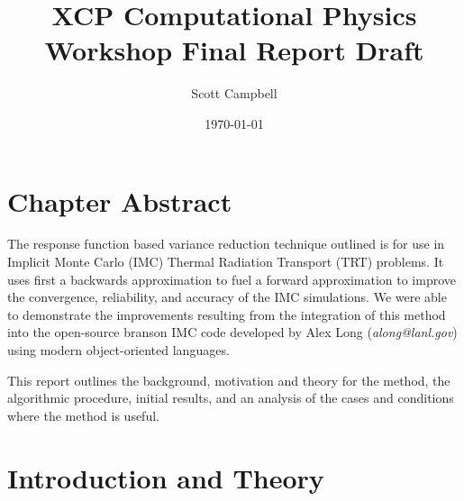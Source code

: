\documentclass[]{article}
\begin{document}
	\title{XCP Computational Physics Workshop Final Report Draft}
	\author{Scott Campbell}
	\date{\today}
	
	\maketitle
	
\section{Chapter Abstract}
	The response function based variance reduction technique outlined is for use in Implicit Monte Carlo (IMC) Thermal Radiation Transport (TRT) problems. It uses first a backwards approximation to fuel a forward approximation to improve the convergence, reliability, and accuracy of the IMC simulations. We were able to demonstrate the improvements resulting from the integration of this method into the open-source branson IMC code developed by Alex Long (\textit{along@lanl.gov}) using modern object-oriented languages. 
	
	This report outlines the background, motivation and theory for the method, the algorithmic procedure, initial results, and an analysis of the cases and conditions where the method is useful. 
	
\section{Introduction and Theory}
\end{document}
